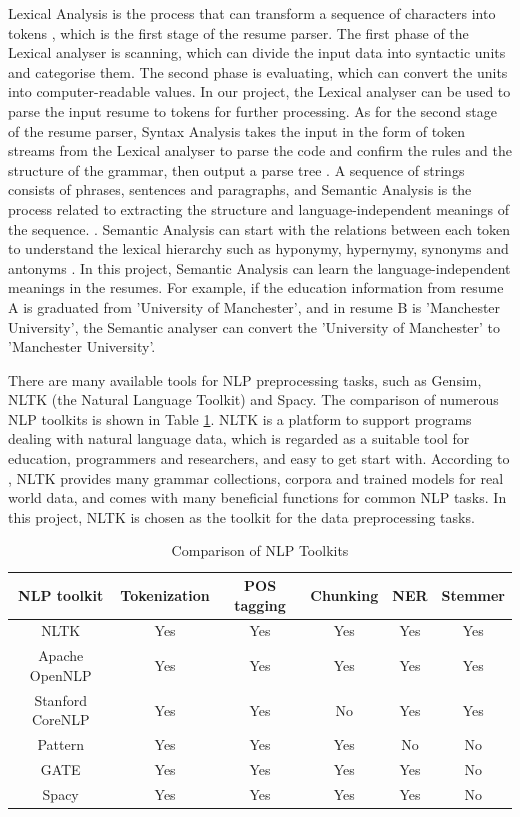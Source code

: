 Lexical Analysis is the process that can transform a sequence of characters into tokens \cite{enwiki:1077694767}, which is the first stage of the resume parser. The first phase of the Lexical analyser is scanning, which can divide the input data into syntactic units and categorise them. The second phase is evaluating, which can convert the units into computer-readable values. In our project, the Lexical analyser can be used to parse the input resume to tokens for further processing. As for the second stage of the resume parser, Syntax Analysis takes the input in the form of token streams from the Lexical analyser to parse the code and confirm the rules and the structure of the grammar, then output a parse tree \cite{smith_2022}. A sequence of strings consists of phrases, sentences and paragraphs, and Semantic Analysis is the process related to extracting the structure and language-independent meanings of the sequence. \cite{enwiki:1062314320}. Semantic Analysis can start with the relations between each token to understand the lexical hierarchy such as hyponymy, hypernymy, synonyms and antonyms \cite{manning1999foundations}. In this project, Semantic Analysis can learn the language-independent meanings in the resumes. For example, if the education information from resume A is graduated from 'University of Manchester', and in resume B is 'Manchester University', the Semantic analyser can convert the 'University of Manchester' to 'Manchester University'.

There are many available tools for NLP preprocessing tasks, such as Gensim, NLTK (the Natural Language Toolkit) and Spacy. The comparison of numerous NLP toolkits is shown in Table \ref{tbl:1}. NLTK is a platform to support programs dealing with natural language data, which is regarded as a suitable tool for education, programmers and researchers, and easy to get start with. According to \cite{yogish2018review}, NLTK provides many grammar collections, corpora and trained models for real world data, and comes with many beneficial functions for common NLP tasks. In this project, NLTK is chosen as the toolkit for the data preprocessing tasks.

\begin{table}[htbp]
\centering
\begin{tabular}{|c|c|c|c|c|c|}
\hline
NLP toolkit & Tokenization & POS tagging & Chunking & NER & Stemmer \\
\hline
NLTK & Yes & Yes & Yes & Yes & Yes \\ 
\hline
Apache OpenNLP  & Yes & Yes & Yes & Yes & Yes \\
\hline
Stanford CoreNLP  & Yes & Yes & No & Yes & Yes \\
\hline
Pattern  & Yes & Yes & Yes & No & No \\
\hline
GATE & Yes & Yes & Yes & Yes & No \\
\hline
Spacy  & Yes & Yes & Yes & Yes & No \\
\hline

\end{tabular}
\caption{Comparison of NLP Toolkits \cite{yogish2018review}}
\label{tbl:1}
\end{table}

